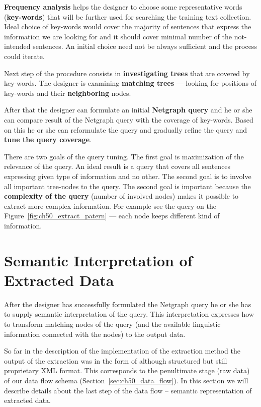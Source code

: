 \textbf{Frequency analysis} helps the designer to choose some representative words (\textbf{key-words}) that will be further used for searching the training text collection. Ideal choice of key-words would cover the majority of sentences that express the information we are looking for and it should cover minimal number of the not-intended sentences. An initial choice need not be always sufficient and the process could iterate.

Next step of the procedure consists in \textbf{investigating trees} that are covered by key-words. The designer is examining \textbf{matching trees} --- looking for positions of key-words and their \textbf{neighboring} nodes.

After that the designer can formulate an initial \textbf{Netgraph query} and he or she can compare result of the Netgraph query with the coverage of key-words. Based on this he or she can reformulate the query and gradually refine the query and \textbf{tune the query coverage}.

There are two goals of the query tuning. The first goal is maximization of the relevance of the query. An ideal result is a query that covers all sentences expressing given type of information and no other. The second goal is to involve all important tree-nodes to the query. The second goal is important because the \textbf{complexity of the query} (number of involved nodes) makes it possible to extract more complex information. For example see the query on the Figure~\ref{fig:ch50_extract_patern} --- each node keeps different kind of information.


\section{Semantic Interpretation of Extracted Data} \label{sec:ch50_sem_interpret}

After the designer has successfully formulated the Netgraph query he or she has to supply semantic interpretation of the query. This interpretation expresses how to transform matching nodes of the query (and the available linguistic information connected with the nodes) to the output data.

So far in the description of the implementation of the extraction method the output of the extraction was in the form of although structured but still proprietary XML format. This corresponds to the penultimate stage (raw data) of our data flow schema (Section~\ref{sec:ch50_data_flow}). In this section we will describe details about the last step of the data flow -- semantic representation of extracted data.

